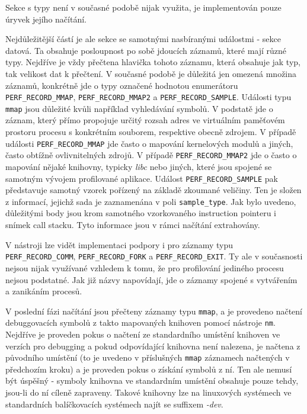 \documentclass[czech,BP]{thesiskiv}
\begin{document}
Sekce s typy není v současné podobě nijak využita, je implementován pouze úryvek jejího načítání.

Nejdůležitější částí je ale sekce se samotnými nasbíranými událostmi - sekce datová. Ta obsahuje posloupnost po sobě jdoucích záznamů, které mají různé typy. Nejdříve je vždy přečtena hlavička tohoto záznamu, která obsahuje jak typ, tak velikost dat k přečtení. V současné podobě je důležitá jen omezená množina záznamů, konkrétně jde o typy označené hodnotou enumerátoru \texttt{PERF\_RECORD\_MMAP}, \texttt{PERF\_RECORD\_MMAP2} a \texttt{PERF\_RECORD\_SAMPLE}. Události typu \texttt{mmap} jsou důležité kvůli například vyhledávání symbolů. V podstatě jde o záznam, který přímo propojuje určitý rozsah adres ve virtuálním paměťovém prostoru procesu s konkrétním souborem, respektive obecně zdrojem. V případě události \texttt{PERF\_RECORD\_MMAP} jde často o mapování kernelových modulů a jiných, často obtížně ovlivnitelných zdrojů. V případě \texttt{PERF\_RECORD\_MMAP2} jde o často o mapování nějaké knihovny, typicky \emph{libc} nebo jiných, které jsou spojené se samotným vývojem profilované aplikace. Událost \texttt{PERF\_RECORD\_SAMPLE} pak představuje samotný vzorek pořízený na základě zkoumané veličiny. Ten je složen z informací, jejichž sada je zaznamenána v poli \texttt{sample\_type}. Jak bylo uvedeno, důležitými body jsou krom samotného vzorkovaného instruction pointeru i snímek call stacku. Tyto informace jsou v rámci načítání extrahovány.

V nástroji lze vidět implementaci podpory i pro záznamy typu\\ \texttt{PERF\_RECORD\_COMM}, \texttt{PERF\_RECORD\_FORK} a \texttt{PERF\_RECORD\_EXIT}. Ty ale v současnosti nejsou nijak využívané vzhledem k tomu, že pro profilování jediného procesu nejsou podstatné. Jak již názvy napovídají, jde o záznamy spojené s vytvářením a zanikáním procesů.

V poslední fázi načítání jsou přečteny záznamy typu \texttt{mmap}, a je provedeno načtení debuggovacích symbolů z takto mapovaných knihoven pomocí nástroje \texttt{nm}. Nejdříve je proveden pokus o načtení ze standardního umístění knihoven ve verzích pro debugging a pokud odpovídající knihovna není nalezena, je načtena z původního umístění (to je uvedeno v příslušných \texttt{mmap} záznamech načtených v předchozím kroku) a je proveden pokus o získání symbolů z ní. Ten ale nemusí být úspěšný - symboly knihovna ve standardním umístění obsahuje pouze tehdy, jsou-li do ní cíleně zapraveny. Takové knihovny lze na linuxových systémech ve standardních balíčkovacích systémech najít se suffixem \emph{-dev}.
\end{document}
